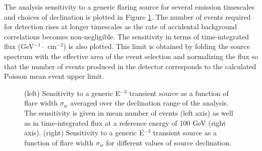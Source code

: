 \documentclass[manuscript]{aastex}
\begin{document}
The analysis sensitivity to a generic flaring source for several emission timescales and choices of declination is plotted in Figure \ref{fig:GenericE3Limit}. The number of events required for detection rises at longer timescales as the rate of accidental background correlations becomes non-negligible. The sensitivity in terms of time-integrated flux (GeV$^{-1} \cdot$ cm$^{-2}$) is also plotted. This limit is obtained by folding the source spectrum with the effective area of the event selection and normalizing the flux so that the number of events produced in the detector corresponds to the calculated Poisson mean event upper limit. 

\begin{figure}[ht]
\caption[Time-integrated Flux Limit for E$^{-3}$ Source]{(left) Sensitivity to a generic E$^{-3}$ transient source as a function of flare width $\sigma_w$ averaged over the declination range of the analysis. The sensitivity is given in mean number of events (left axis) as well as in time-integrated flux at a reference energy of 100 GeV (right axis). (right) Sensitivity to a generic E$^{-3}$ transient source as a function of flare width $\sigma_w$ for different values of source declination.}
\label{fig:GenericE3Limit}
\end{figure}
\end{document}
